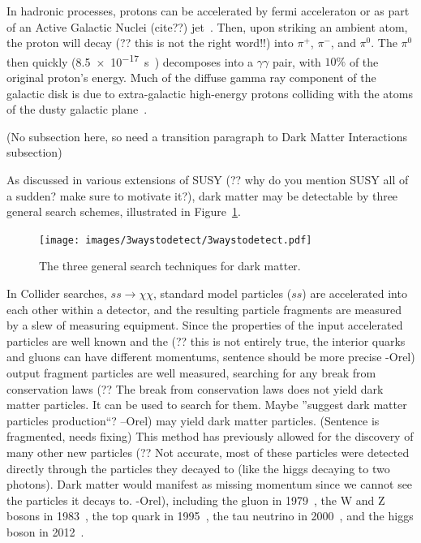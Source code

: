   In hadronic processes, protons can be accelerated by fermi acceleraton or as part of an {\color{red}Active Galactic Nuclei (cite??)} jet~\cite{hadronic1,hadronic2}.
  Then, upon striking an ambient atom, the proton will {\color{red}decay (?? this is not the right word!!)} into $\pi^{+}$, $\pi^{-}$, and $\pi^{0}$.
  The $\pi^{0}$ then quickly (\SI{8.5e-17}{s}~\cite{pdg2016}) decomposes into a $\gamma\gamma$ pair, with \nicetilde$10\%$ of the original proton's energy.
  Much of the diffuse gamma ray component of the galactic disk is due to extra-galactic high-energy protons colliding with the atoms of the dusty galactic plane~\cite{GalacticDiffuseGammaRays}.

  {\color{red}(No subsection here, so need a transition paragraph to Dark Matter Interactions subsection)}
  
    {\color{red}As discussed in various extensions of SUSY (?? why do you mention SUSY all of a sudden? make sure to motivate it?)}, dark matter may be detectable by three general search schemes, illustrated in Figure~\ref{fig:3_searches}.

    \begin{figure}[ht]
      \centering
      \texttt{[image: images/3waystodetect/3waystodetect.pdf]}
      \caption[3 Search Techniques]{
        The three general search techniques for dark matter.}
      \label{fig:3_searches}
    \end{figure}
    

    In Collider searches, $ss \rightarrow \chi\chi$, standard model particles ($ss$) are accelerated into each other within a detector, and the resulting particle fragments are measured by a slew of measuring equipment.
    {\color{red}Since the properties of the input accelerated particles are well known and the (?? this is not entirely true, the interior quarks and gluons can have different momentums, sentence should be more precise -Orel)} output fragment particles are well measured, searching for any break from {\color{red}conservation laws (?? The break from conservation laws does not yield dark matter particles. It can be used to search for them. Maybe ''suggest dark matter particles production``? --Orel)} may yield dark matter particles. {\color{red}(Sentence is fragmented, needs fixing)}
    {\color{red}This method has previously allowed for the discovery of many other new particles (?? Not accurate, most of these particles were detected directly through the particles they decayed to (like the higgs decaying to two photons). Dark matter would manifest as missing momentum since we cannot see the particles it decays to. -Orel)}, including the gluon in 1979~\cite{gluon_discovery}, the W and Z bosons in 1983~\cite{WZ_discovery1,WZ_discovery2}, the top quark in 1995~\cite{top_discovery}, the tau neutrino in 2000~\cite{tau_neutrino_discovery}, and the higgs boson in 2012~\cite{Higgs_ATLAS,Higgs_CMS}.

